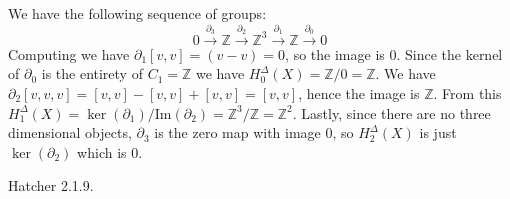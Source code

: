     \begin{solution}
        We have the following sequence of groups:
        \begin{equation*}
            0\overset{\partial_{3}}{\longrightarrow}\mathbb{Z}
            \overset{\partial_{2}}{\longrightarrow}\mathbb{Z}^{3}
            \overset{\partial_{1}}{\longrightarrow}\mathbb{Z}
            \overset{\partial_{0}}{\longrightarrow}{0}
        \end{equation*}
        Computing we have $\partial_{1}[v,v]=(v-v)=0$, so the image is $0$.
        Since the kernel of $\partial_{0}$ is the entirety of $C_{1}=\mathbb{Z}$
        we have $H_{0}^{\Delta}(X)=\mathbb{Z}/0=\mathbb{Z}$. We have
        $\partial_{2}[v,v,v]=[v,v]-[v,v]+[v,v]=[v,v]$, hence the image is
        $\mathbb{Z}$. From this
        $H_{1}^{\Delta}(X)=\ker(\partial_{1})/\textrm{Im}(\partial_{2})=\mathbb{Z}^{3}/\mathbb{Z}=\mathbb{Z}^{2}$.
        Lastly, since there are no three dimensional objects, $\partial_{3}$ is the
        zero map with image $0$, so $H_{2}^{\Delta}(X)$ is just $\ker(\partial_{2})$ which is 0.
    \end{solution}
    \begin{problem}
        Hatcher 2.1.9.
    \end{problem}
